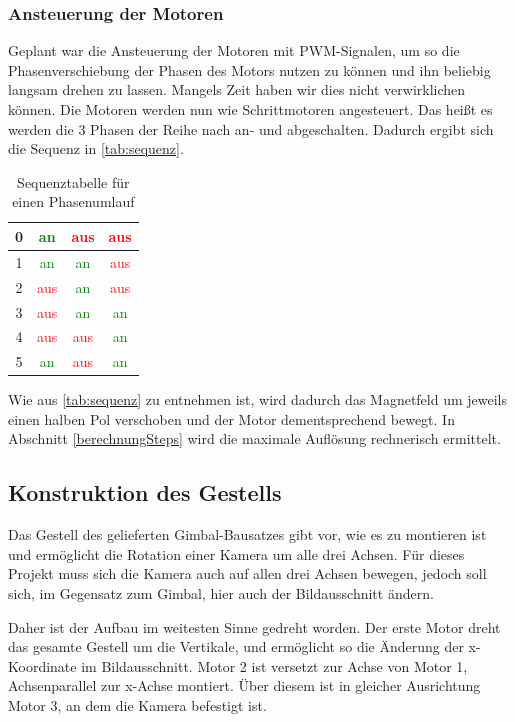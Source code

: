\documentclass[12pt,a4paper,bibliography=totocnumbered,listof=totocnumbered]{scrartcl}
\begin{document}
\subsubsection{Ansteuerung der Motoren}
Geplant war die Ansteuerung der Motoren mit PWM-Signalen, um so die Phasenverschiebung der Phasen des Motors nutzen zu können und ihn beliebig langsam drehen zu lassen. Mangels Zeit haben wir dies nicht verwirklichen können. Die Motoren werden nun wie Schrittmotoren angesteuert. Das heißt es werden die 3 Phasen der Reihe nach an- und abgeschalten. Dadurch ergibt sich die Sequenz in \autoref{tab:sequenz}.
\begin{table}[htp] 
	\centering 
	\begin{tabular}{|c|c|c|c|}
		\hline
		0 & \textcolor{green}{an} & \textcolor{red}{aus} & \textcolor{red}{aus}  \\ 
		\hline 
		1 & \textcolor{green}{an} & \textcolor{green}{an} & \textcolor{red}{aus}  \\ 
		\hline 
		2 & \textcolor{red}{aus}  & \textcolor{green}{an} & \textcolor{red}{aus}  \\ 
		\hline 
		3 & \textcolor{red}{aus}  & \textcolor{green}{an} & \textcolor{green}{an} \\ 
		\hline 
		4 & \textcolor{red}{aus}  & \textcolor{red}{aus}  & \textcolor{green}{an} \\ 
		\hline 
		5 & \textcolor{green}{an} & \textcolor{red}{aus}  & \textcolor{green}{an} \\ 
		\hline
	\end{tabular} 
	\caption{Sequenztabelle für einen Phasenumlauf} 
	\label{tab:sequenz}
\end{table}

Wie aus \autoref{tab:sequenz} zu entnehmen ist, wird dadurch das Magnetfeld um jeweils einen halben Pol verschoben und der Motor dementsprechend bewegt. In Abschnitt \ref{berechnungSteps} wird die maximale Auflösung rechnerisch ermittelt.
\subsection{Konstruktion des Gestells}
Das Gestell des gelieferten Gimbal-Bausatzes gibt vor, wie es zu montieren ist und ermöglicht die Rotation einer Kamera um alle drei Achsen. Für dieses Projekt muss sich die Kamera auch auf allen drei Achsen bewegen, jedoch soll sich, im Gegensatz zum Gimbal, hier auch der Bildausschnitt ändern.

Daher ist der Aufbau im weitesten Sinne gedreht worden. Der erste Motor dreht das gesamte Gestell um die Vertikale, und ermöglicht so die Änderung der x-Koordinate im Bildausschnitt. Motor 2 ist versetzt zur Achse von Motor 1, Achsenparallel zur x-Achse montiert. Über diesem ist in gleicher Ausrichtung Motor 3, an dem die Kamera befestigt ist.
\end{document}
